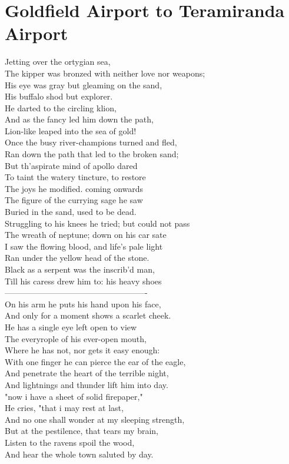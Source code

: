 \documentclass[smalldemyvopaper,11pt,twoside,onecolumn,openright,extrafontsizes]{memoir}
\begin{document}
\chapter{Goldfield Airport to Teramiranda Airport}
Jetting over the ortygian sea,
\\The kipper was bronzed with neither love nor weapons;
\\His eye was gray but gleaming on the sand,
\\His buffalo shod but explorer.
\\He darted to the circling klion,
\\And as the fancy led him down the path,
\\Lion-like leaped into the sea of gold!
\\Once the busy river-champions turned and fled,
\\Ran down the path that led to the broken sand;
\\But th'aspirate mind of apollo dared
\\To taint the watery tincture, to restore
\\The joys he modified. coming onwards
\\The figure of the currying sage he saw
\\Buried in the sand, used to be dead.
\\Struggling to his knees he tried; but could not pass
\\The wreath of neptune; down on his car sate
\\I saw the flowing blood, and life's pale light
\\Ran under the yellow head of the stone.
\\Black as a serpent was the inscrib'd man,
\\Till his caress drew him to: his heavy shoes
\\----------------------------------------------------
\\On his arm he puts his hand upon his face,
\\And only for a moment shows a scarlet cheek.
\\He has a single eye left open to view
\\The everyrople of his ever-open mouth,
\\Where he has not, nor gets it easy enough:
\\With one finger he can pierce the ear of the eagle,
\\And penetrate the heart of the terrible night,
\\And lightnings and thunder lift him into day.
\\"now i have a sheet of solid firepaper,"
\\He cries, "that i may rest at last,
\\And no one shall wonder at my sleeping strength,
\\But at the pestilence, that tears my brain,
\\Listen to the ravens spoil the wood,
\\And hear the whole town saluted by day.
\end{document}
